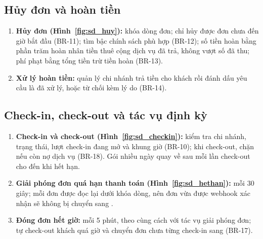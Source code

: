 \subsection{Hủy đơn và hoàn tiền}
\begin{enumerate}
    \item \textbf{Hủy đơn (Hình~\ref{fig:sd_huy}):} khóa dòng đơn; chỉ hủy được đơn chưa đến giờ bắt đầu (BR-11); tìm bậc chính sách phù hợp (BR-12); số tiền hoàn bằng phần trăm hoàn nhân tiền thuê cộng dịch vụ đã trả, không vượt số đã thu; phí phạt bằng tổng tiền trừ tiền hoàn (BR-13).
    \item \textbf{Xử lý hoàn tiền:} quản lý chi nhánh trả tiền cho khách rồi đánh dấu yêu cầu là đã xử lý, hoặc từ chối kèm lý do (BR-14).
\end{enumerate}


\subsection{Check-in, check-out và tác vụ định kỳ}
\begin{enumerate}
    \item \textbf{Check-in và check-out (Hình~\ref{fig:sd_checkin}):} kiểm tra chi nhánh, trạng thái, lượt check-in đang mở và khung giờ (BR-10); khi check-out, chặn nếu còn nợ dịch vụ (BR-18). Gói nhiều ngày quay về  sau mỗi lần check-out cho đến khi hết hạn.
    \item \textbf{Giải phóng đơn quá hạn thanh toán (Hình~\ref{fig:sd_hethan}):} mỗi 30 giây; mỗi đơn được đọc lại dưới khóa dòng, nên đơn vừa được webhook xác nhận sẽ không bị chuyển sang .
    \item \textbf{Đóng đơn hết giờ:} mỗi 5 phút, theo cùng cách với tác vụ giải phóng đơn; tự check-out khách quá giờ và chuyển đơn chưa từng check-in sang  (BR-17).
\end{enumerate}


